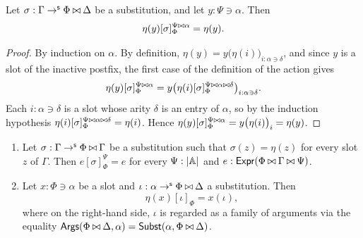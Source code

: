 \begin{lemma}\label{lem:eta-depth}
    Let $\sigma : \Gamma \to^{\mathsf{s}} \Phi \mathbin{\bowtie} \Delta$ be a substitution, and let $y : \Psi \ni \alpha$. Then
    \[
    \eta(y)[\sigma]_\Phi^{\Psi \mathbin{\bowtie} \alpha} = \eta(y).
    \]
\end{lemma}

\begin{proof}
    By induction on $\alpha$. By definition, $\eta(y) = y\big(\eta(i)\big)_{i : \alpha \ni \delta}$, and since $y$ is a slot of the inactive postfix, the first case of the definition of the action gives
    \[
    \eta(y)[\sigma]_\Phi^{\Psi \mathbin{\bowtie} \alpha} = y\big(\eta(i)[\sigma]_\Phi^{\Psi \mathbin{\bowtie} \alpha \mathbin{\bowtie} \delta}\big)_{i : \alpha \ni \delta}.
    \]
    Each $i : \alpha \ni \delta$ is a slot whose arity $\delta$ is an entry of $\alpha$, so by the induction hypothesis $\eta(i)[\sigma]_\Phi^{\Psi \mathbin{\bowtie} \alpha \mathbin{\bowtie} \delta} = \eta(i)$. Hence $\eta(y)[\sigma]_\Phi^{\Psi \mathbin{\bowtie} \alpha} = y\big(\eta(i)\big)_{i} = \eta(y)$.
\end{proof}

\begin{lemma}\label{lem:identity-like}
    \begin{enumerate}
        \item Let $\sigma : \Gamma \to^{\mathsf{s}} \Phi \mathbin{\bowtie} \Gamma$ be a substitution such that $\sigma(z) = \eta(z)$ for every slot $z$ of $\Gamma$. Then $e[\sigma]_\Phi^\Psi = e$ for every $\Psi : \left|\mathbb{A}\right|$ and $e : \mathsf{Expr}(\Phi\mathbin{\bowtie}\Gamma\mathbin{\bowtie}\Psi)$.
        \item Let $x : \Phi \ni \alpha$ be a slot and $\iota : \alpha \to^{\mathsf{s}} \Phi \mathbin{\bowtie} \Delta$ a substitution. Then
        \[
        \eta(x)[\iota]_\Phi = x(\iota),
        \]
        where on the right-hand side, $\iota$ is regarded as a family of arguments via the equality $\mathsf{Args}(\Phi \mathbin{\bowtie} \Delta, \alpha) = \mathsf{Subst}(\alpha, \Phi \mathbin{\bowtie} \Delta)$.
    \end{enumerate}
\end{lemma}

